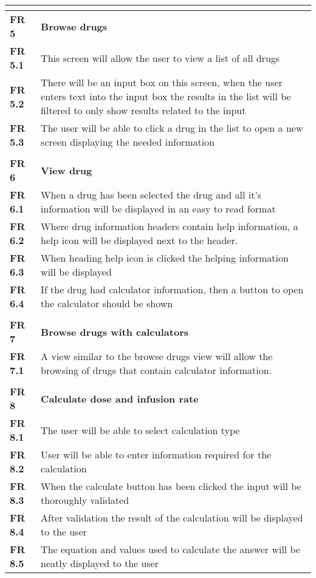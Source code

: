 \begin{center}
\begin{longtable}{| l | p{13cm} |}
\textbf{}  &  \\ \hline
\textbf{FR 5}   & \textbf{Browse drugs}\\ \hline
\textbf{FR 5.1} & This screen will allow the user to view a list of all drugs  \\ \hline
\textbf{FR 5.2} & There will be an input box on this screen, when the user enters text into the input box the results in the list will be filtered to only show results related to the input \\ \hline
\textbf{FR 5.3} & The user will be able to click a drug in the list to open a new screen displaying the needed information  \\ \hline
\textbf{}  &  \\ \hline
\textbf{FR 6}   & \textbf{View drug}   \\ \hline
\textbf{FR 6.1} & When a drug has been selected the drug and all it’s information will be displayed in an easy to read format    \\ \hline
\textbf{FR 6.2} & Where drug information headers contain help information, a help icon will be displayed next to the header.\\ \hline
\textbf{FR 6.3} & When heading help icon is clicked the helping information will be displayed \\ \hline
\textbf{FR 6.4} & If the drug had calculator information, then a button to open the calculator should be shown    \\ \hline
\textbf{}  &  \\ \hline
\textbf{FR 7}   & \textbf{Browse drugs with calculators}   \\ \hline
\textbf{FR 7.1} & A view similar to the browse drugs view will allow the browsing of drugs that contain calculator information.  \\ \hline
\textbf{}  &  \\ \hline
\textbf{FR 8}   & \textbf{Calculate dose and infusion rate}\\ \hline
\textbf{FR 8.1} & The user will be able to select calculation type   \\ \hline
\textbf{FR 8.2} & User will be able to enter information required for the calculation    \\ \hline
\textbf{FR 8.3} & When the calculate button has been clicked the input will be thoroughly validated\\ \hline
\textbf{FR 8.4} & After validation the result of the calculation will be displayed to the user\\ \hline
\textbf{FR 8.5} & The equation and values used to calculate the answer will be neatly displayed to the user  \\ \hline

\end{longtable}
\end{center}
